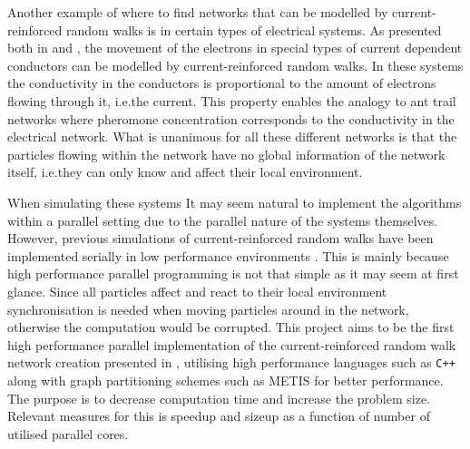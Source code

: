 Another example of where to find networks that can be modelled by current-reinforced random walks is in certain types of electrical systems. As presented both in \cite{Sumpter} and \cite{Doyle}, the movement of the electrons in special types of current dependent conductors can be modelled by current-reinforced random walks. In these systems the conductivity in the conductors is proportional to the amount of electrons flowing through it, i.e.\@ the current. This property enables the analogy to ant trail networks where pheromone concentration corresponds to the conductivity in the electrical network. What is unanimous for all these different networks is that the particles flowing within the network have no global information of the network itself, i.e.\@ they can only know and affect their local environment. 

When simulating these systems It may seem natural to implement the algorithms within a parallel setting due to the parallel nature of the systems themselves. However, previous simulations of current-reinforced random walks have been implemented serially in low performance environments \cite{Sumpter, Ma2012rib}. This is mainly because high performance parallel programming is not that simple as it may seem at first glance. Since all particles affect and react to their local environment synchronisation is needed when moving particles around in the network, otherwise the computation would be corrupted. This project aims to be the first high performance parallel implementation of the current-reinforced random walk network creation presented in \cite{Sumpter}, utilising high performance languages such as \texttt{C++} along with graph partitioning schemes such as METIS for better performance. The purpose is to decrease computation time and increase the problem size. Relevant measures for this is speedup and sizeup as a function of number of utilised parallel cores.